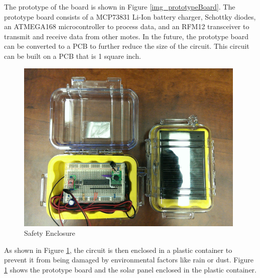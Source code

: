 The prototype of the board is shown in Figure \ref{img_prototypeBoard}. The prototype board consists of a MCP73831 Li-Ion battery charger, Schottky diodes, an ATMEGA168 microcontroller to process data, and an RFM12 transceiver to transmit and receive data from other motes. In the future, the prototype board can be converted to a PCB to further reduce the size of the circuit. This circuit can be built on a PCB that is 1 square inch.

\begin{figure}[htbp]
\centering
\includegraphics[width=110mm]{box_ckt.jpg}
\caption{Safety Enclosure}
\label{img_boxCircuit}
\end{figure}

As shown in Figure \ref{img_boxCircuit}, the circuit is then enclosed in a plastic container to prevent it from being damaged by environmental factors like rain or dust. Figure \ref{img_boxCircuit} shows the prototype board and the solar panel enclosed in the plastic container.
